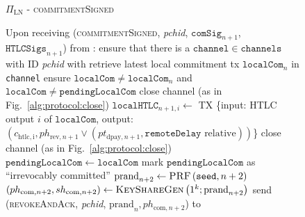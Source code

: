   \begin{figure}[H]
    \begin{protocolbox}{$\Pi_{\mathrm{LN}}$ - \textsc{commitmentSigned}}
      \begin{algorithmic}[1]
        \State Upon receiving (\textsc{commitmentSigned}, \textit{pchid},
        $\mathtt{comSig}_{n+1}$, $\mathtt{HTLCSigs}_{n+1}$) from \bob:
        \Indent
          \State ensure that there is a $\mathtt{channel} \in \mathtt{channels}$
          with ID \textit{pchid} with \bob
          \State retrieve latest local commitment tx $\mathtt{localCom}_n$ in
          \texttt{channel}
          \State ensure $\mathtt{localCom} \neq \mathtt{localCom}_n$ and
          $\mathtt{localCom} \neq \mathtt{pendingLocalCom}$
            \State close channel (as in Fig.~\ref{alg:protocol:close})
            \State \Return
          \EndIf
            \State $\mathtt{localHTLC}_{n+1, i} \gets$ TX \{input: HTLC output
            $i$ of $\mathtt{localCom}$, output: $\left(c_{\mathrm{htlc, i}},
            ph_{\mathrm{rev}, n+1} \vee \left(pt_{\mathrm{dpay}, n+1},
            \mathtt{remoteDelay} \text{ relative}\right)\right)$\}
              \State close channel (as in Fig.~\ref{alg:protocol:close})
              \State \Return
            \EndIf
          \EndFor
          \State $\mathtt{pendingLocalCom} \gets \mathtt{localCom}$
          \State mark $\mathtt{pendingLocalCom}$ as ``irrevocably committed''
          \State $\mathrm{prand}_{n+2} \gets \textsc{PRF}\left(\mathtt{seed},
          n+2\right)$
          \label{alg:protocol:pay:commitmentSigned:prf}
          \State $\left(ph_{\mathrm{com}, n+2}, sh_{\mathrm{com}, n+2}\right)
          \gets \textsc{KeyShareGen}\left(1^k; \mathrm{prand}_{n+2}\right)$
          \State send (\textsc{revokeAndAck}, \textit{pchid}, $\mathrm{prand}_n,
          ph_{\mathrm{com}, n+2}$) to \bob
        \EndIndent
      \end{algorithmic}
    \end{protocolbox}
    \caption{}
    \label{alg:protocol:pay:commitmentSigned}
  \end{figure}

